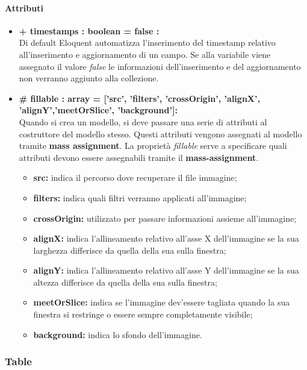 	\paragraph{Attributi}
	\begin{itemize}
		\item \textbf{+ timestamps : boolean = false :}\\
		Di default Eloquent automatizza l'inserimento del timestamp relativo all'inserimento e aggiornamento di un campo. Se alla variabile viene assegnato il valore \textit{false} le informazioni dell'inserimento e del aggiornamento non verranno aggiunto alla collezione.
		\item \textbf{\# fillable : array = [’src’, ’filters’, ’crossOrigin’, ’alignX’, ’alignY’,’meetOrSlice’, ’background’]:}\\
		Quando si crea un modello, si deve passare una serie di attributi al costruttore del modello stesso. Questi attributi vengono assegnati al modello tramite \textbf{mass assignment}. La proprietà \textit{fillable} serve a specificare quali attributi devono essere assegnabili tramite il \textbf{mass-assignment}.
		\begin{itemize}
			\item \textbf{src:} indica il percorso dove recuperare il file immagine;
			\item \textbf{filters:} indica quali filtri verranno applicati all'immagine;
			\item \textbf{crossOrigin:} utilizzato per passare informazioni assieme all'immagine;
			\item \textbf{alignX:} indica l'allineamento relativo all'asse X dell'immagine se la sua larghezza differisce da quella della sua sulla finestra;
			\item \textbf{alignY:} indica l'allineamento relativo all'asse Y dell'immagine se la sua altezza differisce da quella della sua sulla finestra;
			\item \textbf{meetOrSlice:} indica se l'immagine dev'essere tagliata quando la sua finestra si restringe o essere sempre completamente visibile;
			\item \textbf{background:} indica lo sfondo dell'immagine.
		\end{itemize}
	\end{itemize}
\newpage


\subsubsection{Table}

